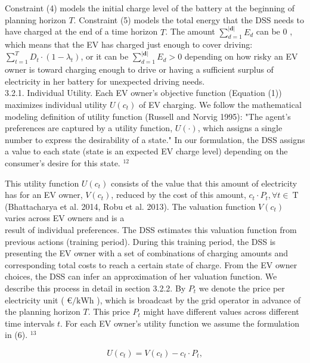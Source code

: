 \documentclass[10pt]{article}
\begin{document}
Constraint (4) models the initial charge level of the battery at the beginning of planning horizon $T$. Constraint (5) models the total energy that the DSS needs to have charged at the end of a time horizon $T$. The amount $\sum_{d=1}^{|\mathbf{d}|} E_{d}$ can be 0 , which means that the EV has charged just enough to cover driving: $\sum_{t=1}^{T} D_{t} \cdot\left(1-\lambda_{t}\right)$, or it can be $\sum_{d=1}^{|\mathbf{d}|} E_{d}>0$ depending on how risky an EV owner is toward charging enough to drive or having a sufficient surplus of electricity in her battery for unexpected driving needs.\\
3.2.1. Individual Utility. Each EV owner's objective function (Equation (1)) maximizes individual utility $U\left(c_{t}\right)$ of EV charging. We follow the mathematical modeling definition of utility function (Russell and Norvig 1995): "The agent's preferences are captured by a utility function, $U(\cdot)$, which assigns a single number to express the desirability of a state." In our formulation, the DSS assigns a value to each state (state is an expected EV charge level) depending on the consumer's desire for this state. ${ }^{12}$

This utility function $U\left(c_{t}\right)$ consists of the value that this amount of electricity has for an EV owner, $V\left(c_{t}\right)$, reduced by the cost of this amount, $c_{t} \cdot P_{t}, \forall t \in \mathrm{~T}$ (Bhattacharya et al. 2014, Robu et al. 2013). The valuation function $V\left(c_{t}\right)$ varies across EV owners and is a\\
result of individual preferences. The DSS estimates this valuation function from previous actions (training period). During this training period, the DSS is presenting the EV owner with a set of combinations of charging amounts and corresponding total costs to reach a certain state of charge. From the EV owner choices, the DSS can infer an approximation of her valuation function. We describe this process in detail in section 3.2.2. By $P_{t}$ we denote the price per electricity unit ( $€ / \mathrm{kWh}$ ), which is broadcast by the grid operator in advance of the planning horizon $T$. This price $P_{t}$ might have different values across different time intervals $t$. For each EV owner's utility function we assume the formulation in (6). ${ }^{13}$


\begin{equation*}
U\left(c_{t}\right)=V\left(c_{t}\right)-c_{t} \cdot P_{t}, \tag{6}
\end{equation*}
\end{document}
